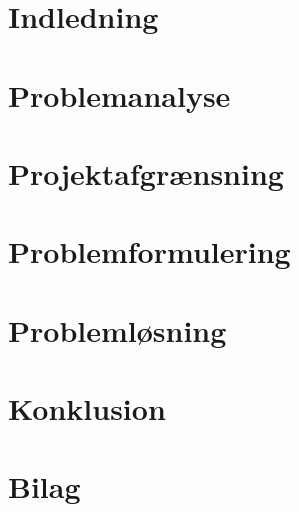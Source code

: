 \documentclass[12pt,hidelinks]{article}
\begin{document}
    \sloppy

	
    \newpage

    \newpage
    \tableofcontents
    \newpage
    \section{Indledning}

	\newpage
    \section{Problemanalyse}
    
    \newpage
    \section{Projektafgrænsning}

	\newpage
    \section{Problemformulering}

    \newpage
    \section{Problemløsning}

	\newpage
    \section{Konklusion}

    \newpage
    
    

	\newpage
    \section{Bilag}

    \newpage
    \begin{appendices}

    \end{appendices}
\end{document}
